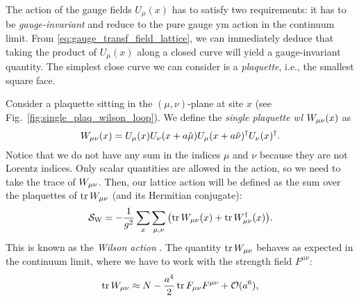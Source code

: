 The action of the gauge fields $U_{\mu}(x)$ has to satisfy two requirements:
it has to be \emph{gauge-invariant} and reduce to the pure gauge \ac{ym} action in the continuum limit.
From \eqref{eq:gauge_transf_field_lattice}, we can immediately deduce that taking the product of $U_{\mu}(x)$ along a closed curve will yield a gauge-invariant quantity.
The simplest close curve we can consider is a \emph{plaquette}, i.e., the smallest square face.

Consider a plaquette sitting in the $(\mu, \nu)$-plane at site $x$ (see Fig.~\ref{fig:single_plaq_wilson_loop}).
We define the \emph{single plaquette \acl{wl}} $W_{\mu \nu}(x)$ as
\begin{equation}
    W_{\mu \nu}(x) =
    U_{\mu}(x) U_{\nu}(x + a \hat{\mu}) U_{\mu}(x + a \hat{\nu})^{\dagger} U_{\nu}(x)^{\dagger}.
    \label{eq:single_plaquette_Wilson_loop}
\end{equation}
Notice that we do not have any sum in the indices $\mu$ and $\nu$ because they are not Lorentz indices.
Only scalar quantities are allowed in the action, so we need to take the trace of $W_{\mu \nu}$.
Then, our lattice action will be defined as the sum over the plaquettes of $\tr W_{\mu \nu}$ (and its Hermitian conjugate):
\begin{equation}
    \mathcal{S}_{\text{W}} = - \frac{1}{g^2} \sum_{x} \sum_{\mu, \nu}  \qty( \tr W_{\mu \nu}(x) + \tr W_{\mu \nu}^{\dagger}(x) ).
    \label{eq:wilson_action}
\end{equation}
This is known as the \emph{Wilson action} \cite{wilson1974confinement, creutz1985book}.
The quantity $\tr W_{\mu \nu}$ behaves as expected in the continuum limit, where we have to work with the strength field $F^{\mu \nu}$:
\begin{equation}
    \tr W_{\mu \nu} \approx N - \frac{a^{4}}{2} \tr F_{\mu \nu} F^{\mu \nu} + \mathcal{O}(a^6),
\end{equation}


\begin{figure}[t]
\end{figure}

